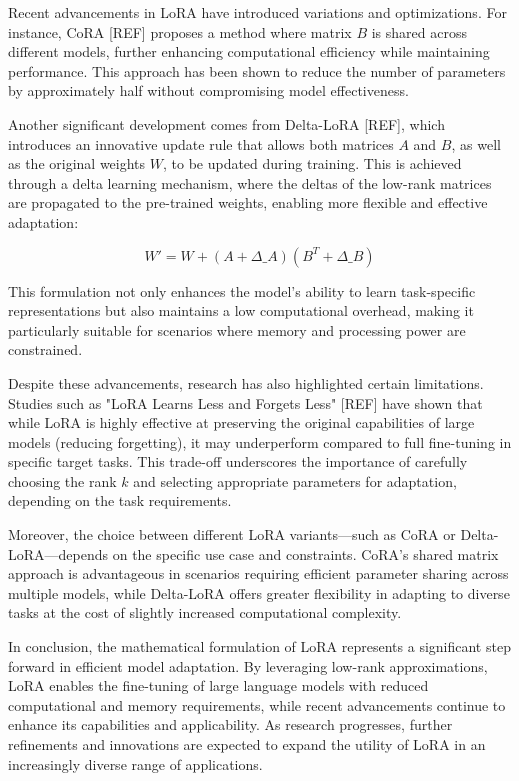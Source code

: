 \documentclass[conference]{IEEEtran}
\begin{document}
Recent advancements in LoRA have introduced variations and optimizations. For instance, CoRA [REF] proposes a method where matrix \( B \) is shared across different models, further enhancing computational efficiency while maintaining performance. This approach has been shown to reduce the number of parameters by approximately half without compromising model effectiveness.

Another significant development comes from Delta-LoRA [REF], which introduces an innovative update rule that allows both matrices \( A \) and \( B \), as well as the original weights \( W \), to be updated during training. This is achieved through a delta learning mechanism, where the deltas of the low-rank matrices are propagated to the pre-trained weights, enabling more flexible and effective adaptation:

\[
W' = W + (A + \Delta\_A)(B^T + \Delta\_B)
\]

This formulation not only enhances the model's ability to learn task-specific representations but also maintains a low computational overhead, making it particularly suitable for scenarios where memory and processing power are constrained.

Despite these advancements, research has also highlighted certain limitations. Studies such as "LoRA Learns Less and Forgets Less" [REF] have shown that while LoRA is highly effective at preserving the original capabilities of large models (reducing forgetting), it may underperform compared to full fine-tuning in specific target tasks. This trade-off underscores the importance of carefully choosing the rank \( k \) and selecting appropriate parameters for adaptation, depending on the task requirements.

Moreover, the choice between different LoRA variants—such as CoRA or Delta-LoRA—depends on the specific use case and constraints. CoRA's shared matrix approach is advantageous in scenarios requiring efficient parameter sharing across multiple models, while Delta-LoRA offers greater flexibility in adapting to diverse tasks at the cost of slightly increased computational complexity.

In conclusion, the mathematical formulation of LoRA represents a significant step forward in efficient model adaptation. By leveraging low-rank approximations, LoRA enables the fine-tuning of large language models with reduced computational and memory requirements, while recent advancements continue to enhance its capabilities and applicability. As research progresses, further refinements and innovations are expected to expand the utility of LoRA in an increasingly diverse range of applications.
\end{document}

